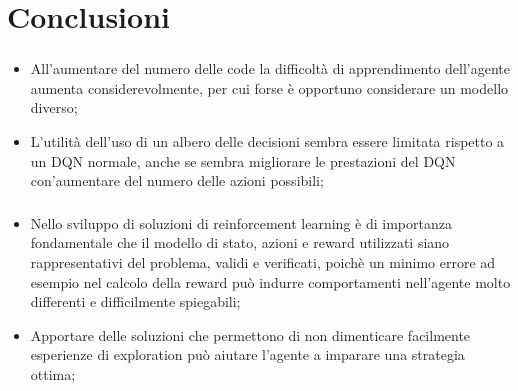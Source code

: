 \documentclass[compress]{beamer}
\begin{document}
\section{Conclusioni}
\begin{frame}
    \frametitle{\secname}
    \begin{itemize}
        \onslide<+-> \item All'aumentare del numero delle code la difficoltà di apprendimento dell'agente
        aumenta considerevolmente, per cui forse è opportuno considerare un modello diverso;
        \onslide<+-> \item L'utilità dell'uso di un albero delle decisioni sembra essere limitata
        rispetto a un DQN normale, anche se sembra migliorare le prestazioni del DQN
        con'aumentare del numero delle azioni possibili;    
    \end{itemize}
\end{frame}
\begin{frame}
    \frametitle{\secname}
    \begin{itemize}
        \onslide<+-> \item Nello sviluppo di soluzioni di reinforcement learning è di importanza fondamentale
        che il modello di stato, azioni e reward utilizzati siano rappresentativi del 
        problema, validi e verificati, poichè un minimo errore ad esempio nel calcolo della
        reward può indurre comportamenti nell'agente molto differenti e difficilmente
        spiegabili;
        \onslide<+-> \item Apportare delle soluzioni che permettono di non dimenticare facilmente
        esperienze di exploration può aiutare l'agente a imparare una strategia ottima;
    \end{itemize}        
\end{frame}
\end{document}
